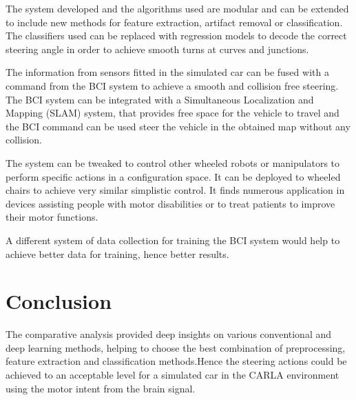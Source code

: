 The system developed and the algorithms used are modular and can be extended to include new methods for feature extraction, artifact removal or classification. The classifiers used can be replaced with regression models to decode the correct steering angle in order to achieve smooth turns at curves and junctions. 

The information from sensors fitted in the simulated car can be fused with a command from the BCI system to achieve a smooth and collision free steering. The BCI system can be integrated with a Simultaneous Localization and Mapping (SLAM) system, that provides free space for the vehicle to travel and the BCI command can be used steer the vehicle in the obtained map without any collision.

The system can be tweaked to control other wheeled robots or manipulators to perform specific actions in a configuration space. It can be deployed to wheeled chairs to achieve very similar simplistic control. It finds numerous application in devices assisting people with motor disabilities or to treat patients to improve their motor functions.

A different system of data collection for training the BCI system would help to achieve better data for training, hence better results.

\section{Conclusion}
The comparative analysis provided deep insights on various conventional and deep learning methods, helping to choose the best combination of preprocessing, feature extraction and classification methods.Hence the steering actions could be achieved to an acceptable level for a simulated car in the CARLA environment using the motor intent from the brain signal. 